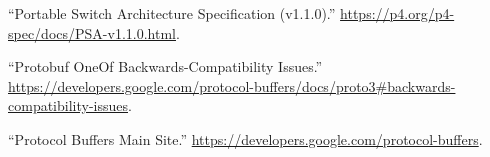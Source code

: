 \documentclass[11pt]{article}
\begin{document}
{{\begin{thebibliography}{38}
\mdbibitemlabel{{}[18]}\textquotedblleft{}Portable Switch Architecture Specification (v1.1.0).\textquotedblright{} \href{https://p4.org/p4-spec/docs/PSA-v1.1.0.html}{{\ttfamily https://\hspace{0pt}p4.\hspace{0pt}org/\hspace{0pt}p4-\hspace{0pt}spec/\hspace{0pt}docs/\hspace{0pt}PSA-\hspace{0pt}v1.\hspace{0pt}1.\hspace{0pt}0.\hspace{0pt}html}}.\label{psa}%

\mdbibitemlabel{{}[19]}\textquotedblleft{}Protobuf OneOf Backwards-Compatibility Issues.\textquotedblright{} \href{https://developers.google.com/protocol-buffers/docs/proto3\%23backwards-compatibility-issues}{{\ttfamily https://\hspace{0pt}developers.\hspace{0pt}google.\hspace{0pt}com/\hspace{0pt}protocol-\hspace{0pt}buffers/\hspace{0pt}docs/\hspace{0pt}proto3\#\hspace{0pt}backwards-\hspace{0pt}compatibility-\hspace{0pt}issues}}.\label{protooneofbackwardscompatibility}%

\mdbibitemlabel{{}[20]}\textquotedblleft{}Protocol Buffers Main Site.\textquotedblright{} \href{https://developers.google.com/protocol-buffers}{{\ttfamily https://\hspace{0pt}developers.\hspace{0pt}google.\hspace{0pt}com/\hspace{0pt}protocol-\hspace{0pt}buffers}}.\label{proto}%


\end{thebibliography}}}
\end{document}
